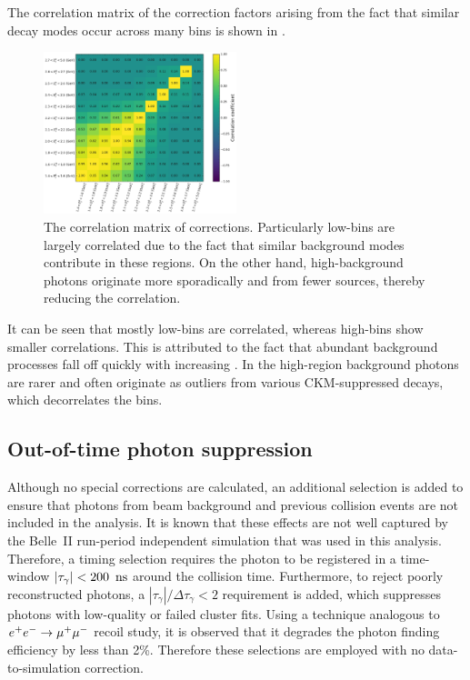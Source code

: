 The correlation matrix of the correction factors arising from the fact that similar decay modes occur across many bins is shown in .
\begin{figure}[htbp!]
    \centering
    \includegraphics[width=0.5\textwidth]{figures/data_sim_corrections/bbar_correlation_matrix.pdf}
    \caption{\label{fig:bbar_correlation_matrix} The correlation matrix of \BB corrections.
    Particularly low-\EB bins are largely correlated due to the fact that similar background modes contribute in these regions.
    On the other hand, high-\EB background photons originate more sporadically and from fewer sources, thereby reducing the correlation.
    }
\end{figure}
It can be seen that mostly low-\EB bins are correlated, whereas high-\EB bins show smaller correlations.
This is attributed to the fact that abundant background processes fall off quickly with increasing \EB.
In the high-\EB region background photons are rarer and often originate as outliers from various CKM-suppressed decays, which decorrelates the bins.

\subsection{Out-of-time photon suppression}\label{sec:out_of_time_photon_suppression}

Although no special corrections are calculated, an additional selection is added to ensure that photons from beam background and previous collision events are not included in the analysis.
It is known that these effects are not well captured by the Belle~II run-period independent simulation that was used in this analysis.
Therefore, a timing selection requires the photon to be registered in a time-window $|\tau_{\gamma}|<200~{\rm \,ns}$ around the collision time.
Furthermore, to reject poorly reconstructed photons, a $|\tau_{\gamma}|/\Delta\tau_{\gamma}<2$ requirement is added, which suppresses photons with low-quality or failed cluster fits.
Using a technique analogous to $e^+e^-\rightarrow\mu^+\mu^-$ recoil study, it is observed that it degrades the photon finding efficiency by less than 2\%.
Therefore these selections are employed with no data-to-simulation correction.

